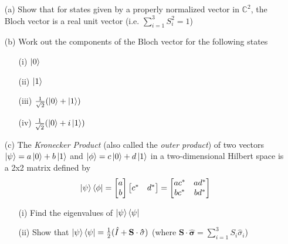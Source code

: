 \documentclass[reprint, amsmath,amssymb, aps]{revtex4-2}
\begin{document}
                \begin{itemize}
                    \item[(a)] Show that for states given by a properly normalized vector in $\mathbb{C}^2$, the Bloch vector is a real unit vector (i.e. $\sum\limits_{i=1}^{3}S_i^2 = 1$)
                    \item[(b)] Work out the components of the Bloch vector for the following states 
                        \begin{enumerate}
                            \item[(i)] $\ket{0}$
                            \item[(ii)] $\ket{1}$
                            \item[(iii)] $\frac{1}{\sqrt{2}}(\ket{0}+\ket{1})$
                            \item[(iv)] $\frac{1}{\sqrt{2}}(\ket{0}+i\ket{1})$
                        \end{enumerate}
                    \item[(c)] The \textit{Kronecker Product} (also called the \textit{outer product}) of two vectors $\ket{\psi} = a\ket{0} + b\ket{1}$ and $\ket{\phi} = c\ket{0} + d\ket{1}$ in a two-dimensional Hilbert space is a 2x2 matrix defined by 
                        \begin{equation*}
                            \ket{\psi}\bra{\phi} = \begin{bmatrix}a \\ b\end{bmatrix} \begin{bmatrix}c^* & d^*\end{bmatrix} = \begin{bmatrix}ac^* & ad^* \\ bc^* & bd^*\end{bmatrix}
                        \end{equation*}
                        \begin{itemize}
                            \item[(i)] Find the eigenvalues of $\ket{\psi}\bra{\psi}$
                            \item[(ii)] Show that $\ket{\psi}\bra{\psi} = \frac{1}{2}(\hat{I}+\mathbf{S}\cdot\mathbf{\hat{\sigma}})$ (where $\mathbf{S}\cdot\mathbf{\hat{\sigma}} = \sum\limits_{i=1}^3 S_i\hat{\sigma}_i$)
                        \end{itemize}
                \end{itemize}
\end{document}
